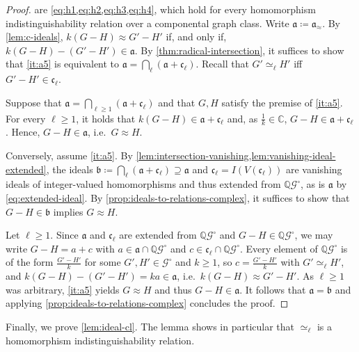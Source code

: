 \documentclass[11pt]{scrartcl}
\theoremstyle{definition}
\theoremstyle{plain}
\theoremstyle{remark}
\newcommand{\lG}{\mathcal{G}^\circ}
\newcommand{\C}{\mathbb{C}}
\begin{document}
	\thmAxiom*
	\begin{proof}
		 are \cref{eq:h1,eq:h2,eq:h3,eq:h4},
		which hold for every homomorphism indistinguishability relation over a componental graph class.
		Write $\mathfrak{a} \coloneqq \mathfrak{a}_{\approx}$.
		By \cref{lem:c-ideals}, $k(G-H) \approx G'-H'$ if, and only if, $k(G-H) - (G'-H') \in \mathfrak{a}$.
		By \cref{thm:radical-intersection}, it suffices to show that \cref{it:a5} is equivalent to
		$\mathfrak{a} = \bigcap_{\ell} (\mathfrak{a} + \mathfrak{c}_\ell)$.
		Recall that $G' \simeq_\ell H'$ iff $G' - H' \in \mathfrak{c}_\ell$.

		Suppose that $\mathfrak{a} = \bigcap_{\ell \geq 1} (\mathfrak{a} + \mathfrak{c}_\ell)$
		and that $G, H$ satisfy the premise of \cref{it:a5}.
		For every $\ell \geq 1$, it holds that  $k(G-H) \in \mathfrak{a} + \mathfrak{c}_\ell$ and, as $\frac1k \in \C$, $G - H \in \mathfrak{a} + \mathfrak{c}_\ell$.
		Hence, $G - H \in \mathfrak{a}$, i.e.\ $G \approx H$.

		Conversely, assume \cref{it:a5}.
		By \cref{lem:intersection-vanishing,lem:vanishing-ideal-extended},
		the ideals $\mathfrak{b} \coloneqq \bigcap_{\ell} (\mathfrak{a} + \mathfrak{c}_\ell) \supseteq \mathfrak{a}$
		and $\mathfrak{c}_\ell = I(V(\mathfrak{c}_\ell))$ are vanishing ideals of integer-valued homomorphisms and thus extended from $\mathbb{Q}\lG$,
		as is $\mathfrak{a}$ by \eqref{eq:extended-ideal}.
		By \cref{prop:ideals-to-relations-complex}, it suffices to show that $G - H \in \mathfrak{b}$ implies $G \approx H$.
		
		Let $\ell \geq 1$.
		Since $\mathfrak{a}$ and $\mathfrak{c}_\ell$ are extended from $\mathbb{Q}\lG$
		and $G-H \in \mathbb{Q}\lG$, we may write $G-H = a + c$
		with $a \in \mathfrak{a} \cap \mathbb{Q}\lG$ and $c \in \mathfrak{c}_\ell \cap \mathbb{Q}\lG$.
		Every element of $\mathbb{Q}\lG$ is of the form $\frac{G' - H'}{k}$ for some $G', H' \in \lG$ and $k \geq 1$,
		so $c = \frac{G' - H'}{k}$ with $G' \simeq_\ell H'$, and $k(G-H) - (G' - H') = ka \in \mathfrak{a}$,
		i.e.\ $k(G-H) \approx G' - H'$.
		As $\ell \geq 1$ was arbitrary, \cref{it:a5} yields
		$G \approx H$ and thus $G - H\in \mathfrak{a}$.
		It follows that $\mathfrak{a} = \mathfrak{b}$ and applying \cref{prop:ideals-to-relations-complex} concludes the proof.
	\end{proof}

    Finally, we prove \cref{lem:ideal-cl}.
    The lemma shows in particular that $\simeq_\ell$ is a homomorphism indistinguishability relation.
    
\end{document}
